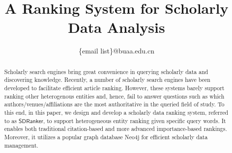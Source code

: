 \documentclass[10pt,conference,letterpaper]{IEEEtran}
\newcommand{\eat}[1]{}
\newcommand{\kw}[1]{{\ensuremath {\mathsf{#1}}}\xspace}
\newcommand{\oursystem}{\kw{SDRanker}}
\begin{document}
\title{A Ranking System for Scholarly Data Analysis}

\eat{
\author{\IEEEauthorblockN{Michael Shell}
\IEEEauthorblockA{School of Electrical and\\Computer Engineering\\
Georgia Institute of Technology\\
Atlanta, Georgia 30332--0250\\
Email: http://www.michaelshell.org/contact.html}
\and
\IEEEauthorblockN{Homer Simpson}
\IEEEauthorblockA{Twentieth Century Fox\\
Springfield, USA\\
Email: homer@thesimpsons.com}
\and
\IEEEauthorblockN{James Kirk\\ and Montgomery Scott}
\IEEEauthorblockA{Starfleet Academy\\
San Francisco, California 96678--2391\\
Telephone: (800) 555--1212\\
Fax: (888) 555--1212}}
}%

\author{
\{email list\}@buaa.edu.cn}

\maketitle


\begin{abstract}
Scholarly search engines bring great convenience in querying scholarly data and discovering knowledge.
%
Recently, a number of scholarly search engines have been developed to facilitate efficient article ranking. However, these systems barely support ranking other heterogenous entities and, hence, fail to answer questions such as which authors/venues/affiliations are the most authoritative in the queried field of study.
%
To this end, in this paper, we design and develop a scholarly data ranking system, referred to as \oursystem, to support heterogeneous entity ranking given specific query words. It enables both traditional citation-based and more advanced importance-based rankings. Moreover, it utilizes a popular graph database Neo4j for efficient scholarly data management.
\end{abstract}
\end{document}
